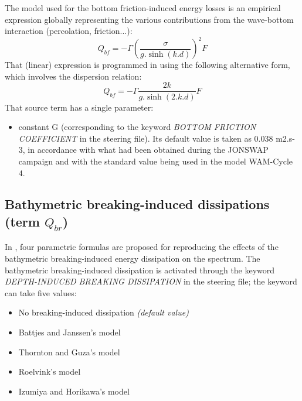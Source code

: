  The model used for the bottom friction-induced energy losses is an empirical
 expression globally representing the various contributions from the
 wave-bottom interaction (percolation, friction...):
\begin{equation} \label{GrindEQ__4_42_}
Q_{bf} =-\Gamma \left(\frac{\sigma }{g.\sinh \left(k.d\right)} \right)^{2} F
\end{equation}
That (linear) expression is programmed in \tomawac using the following
alternative form, which involves the dispersion relation:
\begin{equation} \label{GrindEQ__4_43_}
Q_{bf} =-\Gamma \frac{2k}{g.\sinh \left(2.k.d\right)} F
\end{equation}
That source term has a single parameter:

\begin{itemize}
\item  constant G (corresponding to the keyword \textit{BOTTOM FRICTION
  COEFFICIENT} in the steering file). Its default value is taken as
  0.038 m2.s-3, in accordance with what had been obtained during the JONSWAP
  campaign \cite{Hasselmann1973} and with the standard value being used in
  the model WAM-Cycle 4.
\end{itemize}

\subsection{ Bathymetric breaking-induced dissipations (term $Q_{br}$)}

In \tomawac, four parametric formulas are proposed for reproducing the
effects of the bathymetric breaking-induced energy dissipation on the spectrum.
The bathymetric breaking-induced dissipation is activated through the keyword
\textit{DEPTH-INDUCED BREAKING DISSIPATION} in the steering file; the keyword
can take five values:

\begin{itemize}
\item  No breaking-induced dissipation \textit{(default value)}
\item  Battjes and Janssen's model \cite{Battjes1978}%
\item  Thornton and Guza's model \cite{Thornton1983}%
\item  Roelvink's model \cite{Roelvink1993}%
\item  Izumiya and Horikawa's model \cite{Izumiya1984}%
\end{itemize}

